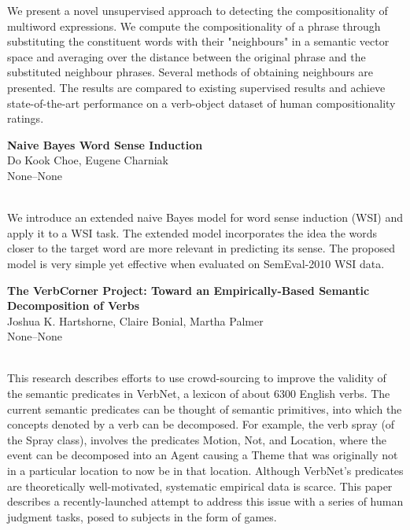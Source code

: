 \documentclass[twoside,makeidx]{book}
\begin{document}
\nopagebreak%
\noindent%
{\small We present a novel unsupervised approach to detecting the compositionality of multiword expressions. We compute the compositionality of a phrase through substituting the constituent words with their "neighbours" in a semantic vector space and averaging over the distance between the original phrase and the substituted neighbour phrases. Several methods of obtaining neighbours are presented. The results are compared to existing supervised results and achieve state-of-the-art performance on a verb-object dataset of human compositionality ratings.}
\par\vspace{2em}\noindent%
\begin{minipage}{\linewidth}%
\begin{center}
\textbf{\normalsize Naive Bayes Word Sense Induction}\\
\normalsize  Do Kook Choe,  Eugene Charniak\\
{\small None--None}\\
\end{center}
\end{minipage}\\[0.5em]
\nopagebreak%
\noindent%
{\small We introduce an extended naive Bayes model for word sense induction (WSI) and apply it to a WSI task. The extended model incorporates the idea the words closer to the target word are more relevant in predicting its sense. The proposed model is very simple yet effective when evaluated on SemEval-2010 WSI data.}
\par\vspace{2em}\noindent%
\begin{minipage}{\linewidth}%
\begin{center}
\textbf{\normalsize The VerbCorner Project: Toward an Empirically-Based Semantic Decomposition of Verbs}\\
\normalsize  Joshua K. Hartshorne,  Claire Bonial,  Martha Palmer\\
{\small None--None}\\
\end{center}
\end{minipage}\\[0.5em]
\nopagebreak%
\noindent%
{\small This research describes efforts to use crowd-sourcing to improve the validity of the semantic predicates in VerbNet, a lexicon of about 6300 English verbs. The current semantic predicates can be thought of semantic primitives, into which the concepts denoted by a verb can be decomposed.  For example, the verb spray (of the Spray class), involves the predicates Motion, Not, and Location, where the event can be decomposed into an Agent causing a Theme that was originally not in a particular location to now be in that location.  Although VerbNet's predicates are theoretically well-motivated, systematic empirical data is scarce.  This paper describes a recently-launched attempt to address this issue with a series of human judgment tasks, posed to subjects in the form of games.}
\end{document}
